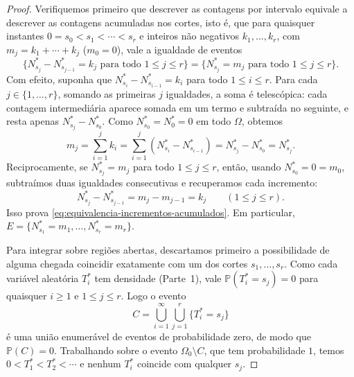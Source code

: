 \documentclass[12pt,portuguese]{article}
\theoremstyle{definition}
\theoremstyle{plainexercise}
\theoremstyle{starredexercise}
\theoremstyle{definition}
\begin{document}
\begin{proof}
Verifiquemos primeiro que descrever as contagens por intervalo equivale a
descrever as contagens acumuladas nos cortes, isto é, que para quaisquer
instantes $0=s_0<s_1<\cdots<s_r$ e inteiros não negativos $k_1,\ldots,k_r$, com
$m_j=k_1+\cdots+k_j$ ($m_0=0$), vale a igualdade de eventos
\begin{equation}\label{eq:equivalencia-incrementos-acumulados}
  \bigl\{N_{s_j}^*-N_{s_{j-1}}^*=k_j \text{ para todo } 1\leqslant j\leqslant r\bigr\}
  =\bigl\{N_{s_j}^*=m_j \text{ para todo } 1\leqslant j\leqslant r\bigr\}.
\end{equation}
Com efeito, suponha que $N_{s_i}^*-N_{s_{i-1}}^*=k_i$ para todo
$1\leqslant i\leqslant r$. Para cada $j\in\{1,\ldots,r\}$, somando as
primeiras $j$ igualdades, a soma é telescópica: cada contagem intermediária
aparece somada em um termo e subtraída no seguinte, e resta apenas
$N_{s_j}^*-N_{s_0}^*$. Como $N_{s_0}^*=N_0^*=0$ em todo $\Omega$, obtemos
\[
  m_j=\sum_{i=1}^j k_i
  =\sum_{i=1}^j (N_{s_i}^*-N_{s_{i-1}}^*)
  =N_{s_j}^*-N_{s_0}^*=N_{s_j}^*.
\]
Reciprocamente, se $N_{s_j}^*=m_j$ para todo $1\leqslant j\leqslant r$, então,
usando $N_{s_0}^*=0=m_0$, subtraímos duas igualdades consecutivas e recuperamos
cada incremento:
\[
  N_{s_j}^*-N_{s_{j-1}}^*=m_j-m_{j-1}=k_j
  \qquad (1\leqslant j\leqslant r).
\]
Isso prova \eqref{eq:equivalencia-incrementos-acumulados}. Em particular,
$E=\{N_{s_1}^*=m_1,\ldots,N_{s_r}^*=m_r\}$.

Para integrar sobre regiões abertas, descartamos primeiro a possibilidade de
alguma chegada coincidir exatamente com um dos cortes $s_1,\ldots,s_r$. Como
cada variável aleatória $T_i^*$ tem densidade (Parte~1), vale
$\mathbb{P}(T_i^*=s_j)=0$ para quaisquer $i\geqslant1$ e $1\leqslant j\leqslant r$.
Logo o evento
\[
  C=\bigcup_{i=1}^{\infty}\bigcup_{j=1}^{r}\{T_i^*=s_j\}
\]
é uma união enumerável de eventos de probabilidade zero, de modo que
$\mathbb{P}(C)=0$. Trabalhando sobre o evento $\Omega_0\setminus C$, que tem
probabilidade $1$, temos $0<T_1^*<T_2^*<\cdots$ e nenhum $T_i^*$ coincide com
qualquer $s_j$.


\end{proof}
\end{document}
